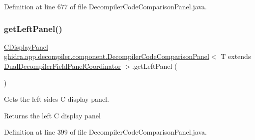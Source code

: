 Definition at line 677 of file Decompiler\+Code\+Comparison\+Panel.\+java.

\mbox{\label{classghidra_1_1app_1_1decompiler_1_1component_1_1_decompiler_code_comparison_panel_a61f49d43d10e1532c9bcd45cafca58b4}} 
\subsubsection{\texorpdfstring{getLeftPanel()}{getLeftPanel()}}
{\footnotesize\ttfamily \mbox{\hyperlink{classghidra_1_1app_1_1decompiler_1_1component_1_1_c_display_panel}{C\+Display\+Panel}} \mbox{\hyperlink{classghidra_1_1app_1_1decompiler_1_1component_1_1_decompiler_code_comparison_panel}{ghidra.\+app.\+decompiler.\+component.\+Decompiler\+Code\+Comparison\+Panel}}$<$ T extends \mbox{\hyperlink{classghidra_1_1app_1_1decompiler_1_1component_1_1_dual_decompiler_field_panel_coordinator}{Dual\+Decompiler\+Field\+Panel\+Coordinator}} $>$.get\+Left\+Panel (\begin{DoxyParamCaption}{ }\end{DoxyParamCaption})\hspace{0.3cm}{\ttfamily [inline]}}

Gets the left side\textquotesingle{}s C display panel. \begin{DoxyReturn}{Returns}
the left C display panel 
\end{DoxyReturn}


Definition at line 399 of file Decompiler\+Code\+Comparison\+Panel.\+java.

